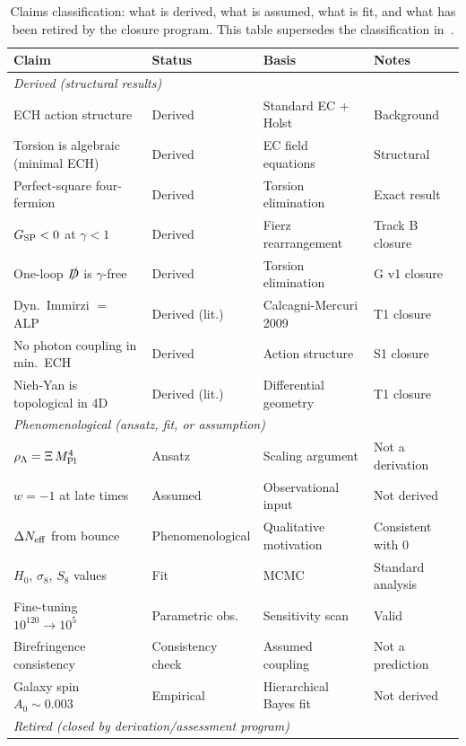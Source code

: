 \documentclass[aps,prd,twocolumn,superscriptaddress,showpacs,preprintnumbers,
  nofootinbib,longbibliography,floatfix]{revtex4-2}
\newcommand{\MPl}{M_{\rm Pl}}
\newcommand{\Neff}{N_{\rm eff}}
\newcommand{\BI}{\gamma}
\newcommand{\Gsp}{G_{\rm SP}}
\begin{document}
\begin{table}[t]
\caption{Claims classification: what is derived, what is assumed, what is
fit, and what has been retired by the closure program. This table
supersedes the classification in~\cite{Golden2026v1}.}
\label{tab:claims}
\begin{ruledtabular}
\begin{tabular}{llll}
\textbf{Claim} & \textbf{Status} & \textbf{Basis} & \textbf{Notes} \\
\hline
\multicolumn{4}{l}{\textit{Derived (structural results)}} \\
ECH action structure & Derived & Standard EC + Holst & Background \\
Torsion is algebraic (minimal ECH) & Derived & EC field equations & Structural \\
Perfect-square four-fermion & Derived & Torsion elimination & Exact result \\
$\Gsp < 0$ at $\BI < 1$ & Derived & Fierz rearrangement & Track B closure \\
One-loop $\slashed{D}$ is $\BI$-free & Derived & Torsion elimination & G v1 closure \\
Dyn.\ Immirzi $=$ ALP & Derived (lit.) & Calcagni-Mercuri 2009 & T1 closure \\
No photon coupling in min.\ ECH & Derived & Action structure & S1 closure \\
Nieh-Yan is topological in 4D & Derived (lit.) & Differential geometry & T1 closure \\
\hline
\multicolumn{4}{l}{\textit{Phenomenological (ansatz, fit, or assumption)}} \\
$\rho_\Lambda = \Xi\,\MPl^4$ & Ansatz & Scaling argument & Not a derivation \\
$w = -1$ at late times & Assumed & Observational input & Not derived \\
$\Delta\Neff$ from bounce & Phenomenological & Qualitative motivation & Consistent with 0 \\
$H_0$, $\sigma_8$, $S_8$ values & Fit & MCMC & Standard analysis \\
Fine-tuning $10^{120} \to 10^5$ & Parametric obs. & Sensitivity scan & Valid \\
Birefringence consistency & Consistency check & Assumed coupling & Not a prediction \\
Galaxy spin $A_0 \sim 0.003$ & Empirical & Hierarchical Bayes fit & Not derived \\
\hline
\multicolumn{4}{l}{\textit{Retired (closed by derivation/assessment program)}} \\

\end{tabular}
\end{ruledtabular}
\end{table}
\end{document}
